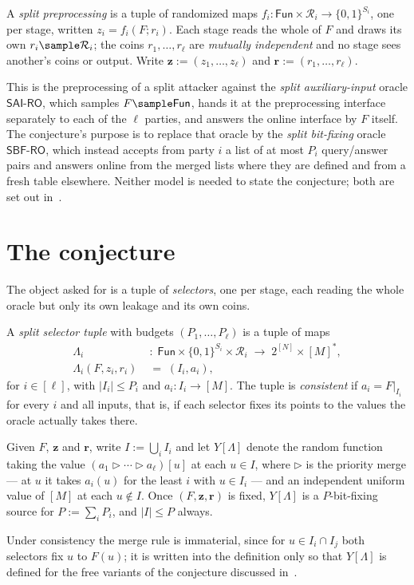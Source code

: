 \documentclass{conjura-conjecture}
\newcommand{\Fun}{\mathsf{Fun}}
\newcommand{\bits}{\{0,1\}}
\newcommand{\vz}{\mathbf{z}}
\newcommand{\vr}{\mathbf{r}}
\newcommand{\SAI}{\mathsf{SAI\text{-}RO}}
\newcommand{\SBF}{\mathsf{SBF\text{-}RO}}
\newcommand{\merge}{\mathbin{\triangleright}}
\begin{document}
\begin{definition}\label{def:pre}
A \emph{split preprocessing} is a tuple of randomized maps
$f_i : \Fun \times \mathcal{R}_i \to \bits^{S_i}$, one per stage, written
$z_i = f_i(F;r_i)$. Each stage reads the whole of $F$ and draws its own
$r_i \sample \mathcal{R}_i$; the coins $r_1,\dots,r_\ell$ are
\emph{mutually independent} and no stage sees another's coins or output.
Write $\vz := (z_1,\dots,z_\ell)$ and $\vr := (r_1,\dots,r_\ell)$.

This is the preprocessing of a split attacker against the \emph{split
auxiliary-input} oracle $\SAI$, which samples $F \sample \Fun$, hands it
at the preprocessing interface separately to each of the $\ell$ parties,
and answers the online interface by $F$ itself. The conjecture's purpose
is to replace that oracle by the \emph{split bit-fixing} oracle $\SBF$,
which instead accepts from party $i$ a list of at most $P_i$ query/answer
pairs and answers online from the merged lists where they are defined and
from a fresh table elsewhere. Neither model is needed to state the
conjecture; both are set out in~\cite[\S3]{PP}.
\end{definition}

\section{The conjecture}\label{sec:conj}

The object asked for is a tuple of \emph{selectors}, one per stage, each
reading the whole oracle but only its own leakage and its own coins.

\begin{definition}\label{def:selector}
A \emph{split selector tuple} with budgets $(P_1,\dots,P_\ell)$ is a tuple
of maps
\[
\begin{aligned}
  \Lambda_i &\;:\; \Fun \times \bits^{S_i} \times \mathcal{R}_i
  \;\longrightarrow\; 2^{[N]} \times [M]^{*}, \\
  \Lambda_i(F,z_i,r_i) &\;=\; (I_i, a_i),
\end{aligned}
\]
for $i \in [\ell]$, with $|I_i| \le P_i$ and $a_i : I_i \to [M]$. The
tuple is \emph{consistent} if $a_i = F|_{I_i}$ for every $i$ and all
inputs, that is, if each selector fixes its points to the values the
oracle actually takes there.

Given $F$, $\vz$ and $\vr$, write $I := \bigcup_i I_i$ and let
$Y[\Lambda]$ denote the random function taking the value
$(a_1 \merge \cdots \merge a_\ell)[u]$ at each $u \in I$, where $\merge$
is the priority merge --- at $u$ it takes $a_i(u)$ for the least $i$ with
$u \in I_i$ --- and an independent uniform value of $[M]$ at each
$u \notin I$. Once $(F,\vz,\vr)$ is fixed, $Y[\Lambda]$ is a
$P$-bit-fixing source for $P := \sum_i P_i$, and $|I| \le P$ always.

Under consistency the merge rule is immaterial, since for
$u \in I_i \cap I_j$ both selectors fix $u$ to $F(u)$; it is written into
the definition only so that $Y[\Lambda]$ is defined for the free variants
of the conjecture discussed in~\cite[\S6]{PP}.
\end{definition}
\end{document}
